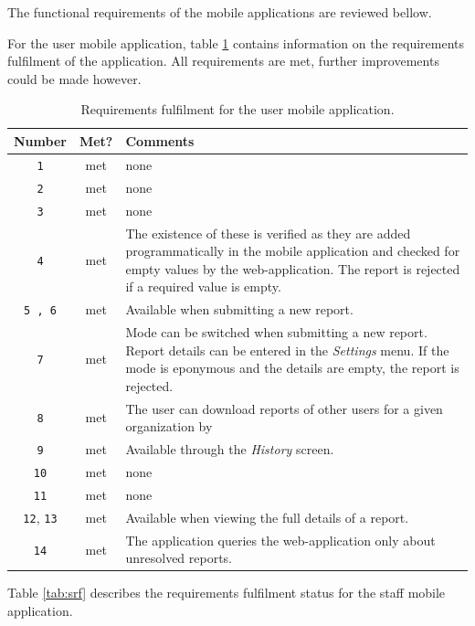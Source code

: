 \documentclass[12pt]{ecsproject}     %
\begin{document}
The functional requirements of the mobile applications are reviewed bellow.

For the user mobile application, table \ref{tab:urf} contains information on the requirements fulfilment of the application. All requirements are met, further improvements could be made however.

\begin{table}
\begin{tabular}{ c | c | p{10cm}}
\textbf{Number} & \textbf{Met?} & \textbf{Comments} \\
\hline
\texttt{1} & met & none \\
\texttt{2} & met & none \\
\texttt{3} & met & none \\
\texttt{4} & met & The existence of these is verified as they are added programmatically in the mobile application and checked for empty values by the web-application. The report is rejected if a required value is empty. \\
\texttt{5 , 6} & met & Available when submitting a new report.\\
\texttt{7} & met & Mode can be switched when submitting a new report. Report details can be entered in the \textit{Settings} menu. If the mode is eponymous and the details are empty, the report is rejected.\\
\texttt{8} & met & The user can download reports of other users for a given organization by \\
\texttt{9} & met & Available through the \textit{History} screen.\\
\texttt{10} & met & none \\
\texttt{11} & met & none \\
\texttt{12}, \texttt{13} & met & Available when viewing the full details of a report.\\
\texttt{14} & met & The application queries the web-application only about unresolved reports.\\
\end{tabular}
\caption{Requirements fulfilment for the user mobile application.}
\label{tab:urf}
\end{table}

Table \ref{tab:srf} describes the requirements fulfilment status for the staff mobile application.
\end{document}
